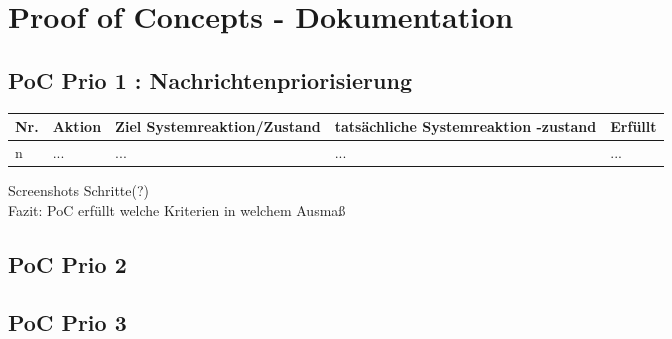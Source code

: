 \documentclass[11pt,oneside,a4paper,notitlepage]{article}
\begin{document}
%
\section{Proof of Concepts - Dokumentation}
%
\subsection{PoC Prio 1 : Nachrichtenpriorisierung}
%
\begin{center}
\begin{tabular}{| p{15mm} | p{30mm} | p{50mm} | p{50mm} | p{15mm} |}
\hline
Nr. & Aktion & Ziel Systemreaktion/Zustand & tatsächliche Systemreaktion -zustand & Erfüllt\\
\hline
n & ... & ... & ... & ... \\
\hline
\end{tabular}
\end{center}
Screenshots Schritte(?)\\
Fazit: PoC erfüllt welche Kriterien in welchem Ausmaß

\subsection{PoC Prio 2}
%

\subsection{PoC Prio 3}
%
\end{document}
